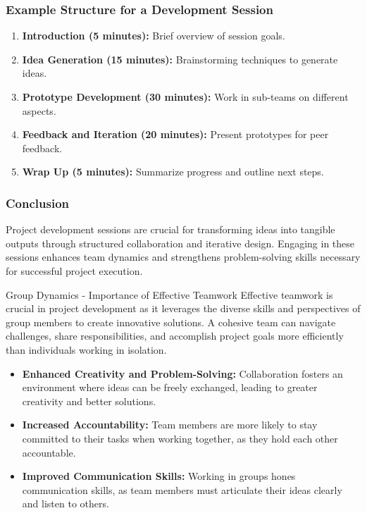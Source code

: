 \documentclass[aspectratio=169]{beamer}
\begin{document}
\begin{frame}[fragile]
    \frametitle{Example Structure for a Development Session}
    \begin{enumerate}
        \item \textbf{Introduction (5 minutes):} Brief overview of session goals.
        \item \textbf{Idea Generation (15 minutes):} Brainstorming techniques to generate ideas.
        \item \textbf{Prototype Development (30 minutes):} Work in sub-teams on different aspects.
        \item \textbf{Feedback and Iteration (20 minutes):} Present prototypes for peer feedback.
        \item \textbf{Wrap Up (5 minutes):} Summarize progress and outline next steps.
    \end{enumerate}
\end{frame}

\begin{frame}[fragile]
    \frametitle{Conclusion}
    \begin{block}{}
        Project development sessions are crucial for transforming ideas into tangible outputs through structured collaboration and iterative design. Engaging in these sessions enhances team dynamics and strengthens problem-solving skills necessary for successful project execution.
    \end{block}
\end{frame}

\begin{frame}[fragile]{Group Dynamics - Importance of Effective Teamwork}
    Effective teamwork is crucial in project development as it leverages the diverse skills and perspectives of group members to create innovative solutions. A cohesive team can navigate challenges, share responsibilities, and accomplish project goals more efficiently than individuals working in isolation.

    \begin{itemize}
        \item \textbf{Enhanced Creativity and Problem-Solving:} Collaboration fosters an environment where ideas can be freely exchanged, leading to greater creativity and better solutions.  
        \item \textbf{Increased Accountability:} Team members are more likely to stay committed to their tasks when working together, as they hold each other accountable.
        \item \textbf{Improved Communication Skills:} Working in groups hones communication skills, as team members must articulate their ideas clearly and listen to others.
    \end{itemize}
\end{frame}
\end{document}
